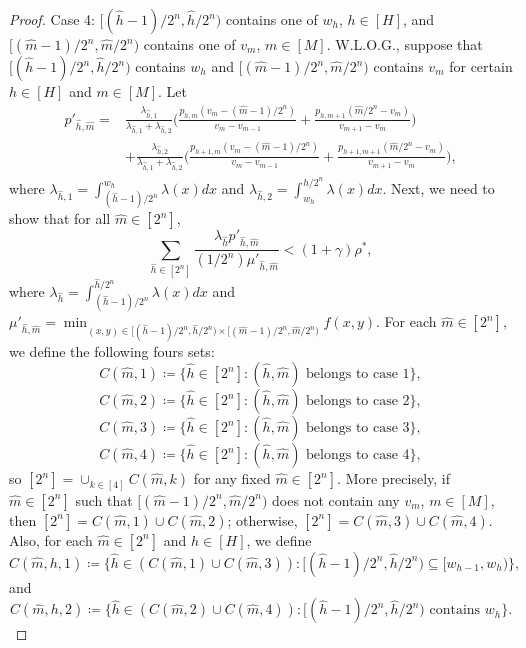 \documentclass[11pt, reqno]{article}
\numberwithin{equation}{section}
\numberwithin{theorem}{section}
\begin{document}
\begin{proof}
Case 4: $[(\hat{h}-1)/2^n,\hat{h}/2^n)$ contains one of $w_h$, $h\in[H]$, and $[(\hat{m}-1)/2^n,\hat{m}/2^n)$ contains one of $v_m$, $m\in[M]$. W.L.O.G., suppose that $[(\hat{h}-1)/2^n,\hat{h}/2^n)$ contains $w_h$ and $[(\hat{m}-1)/2^n,\hat{m}/2^n)$ contains $v_m$ for certain $h\in[H]$ and $m\in[M]$. Let 
\begin{equation*}
    \begin{split}
    p'_{\hat{h},\hat{m}}=&\frac{\lambda_{\hat{h},1}}{\lambda_{\hat{h},1}+\lambda_{\hat{h},2}}\Big(\frac{p_{h,m}(v_m-(\hat{m}-1)/2^n)}{v_m-v_{m-1}}+\frac{p_{h,m+1}(\hat{m}/2^n-v_m)}{v_{m+1}-v_m}\Big)\\
    &+\frac{\lambda_{\hat{h},2}}{\lambda_{\hat{h},1}+\lambda_{\hat{h},2}}\Big(\frac{p_{h+1,m}(v_m-(\hat{m}-1)/2^n)}{v_m-v_{m-1}}+\frac{p_{h+1,m+1}(\hat{m}/2^n-v_m)}{v_{m+1}-v_m}\Big),
\end{split}
\end{equation*}
where $\lambda_{\hat{h},1}=\int_{(\hat{h}-1)/2^n}^{w_h}\lambda(x)dx$ and $\lambda_{\hat{h},2}=\int^{\hat{h}/2^n}_{w_h}\lambda(x)dx$.
Next, we need to show that for all $\hat{m}\in[2^n]$,
\begin{equation}\label{eq: lambda'-p'_hm-mu'}
    \sum_{\hat{h}\in[2^n]}\frac{\lambda_{\hat{h}}p'_{\hat{h},\hat{m}}}{(1/2^n)\mu'_{\hat{h},\hat{m}}}<(1+\gamma)\rho^*,
\end{equation}
where $\lambda_{\hat{h}}=\int_{(\hat{h}-1)/2^n}^{\hat{h}/2^n}\lambda(x)dx$ and $\mu'_{\hat{h},\hat{m}}=\min_{(x,y)\in[(\hat{h}-1)/2^n,\hat{h}/2^n)\times [(\hat{m}-1)/2^n,\hat{m}/2^n)}f(x,y)$.
For each $\hat{m}\in[2^n]$, we define the following fours sets:
$$C(\hat{m},1)\coloneqq\{\hat{h}\in[2^n]:(\hat{h},\hat{m})\text{ belongs to case 1}\},$$
$$C(\hat{m},2)\coloneqq\{\hat{h}\in[2^n]:(\hat{h},\hat{m})\text{ belongs to case 2}\},$$
$$C(\hat{m},3)\coloneqq\{\hat{h}\in[2^n]:(\hat{h},\hat{m})\text{ belongs to case 3}\},$$
$$C(\hat{m},4)\coloneqq\{\hat{h}\in[2^n]:(\hat{h},\hat{m})\text{ belongs to case 4}\},$$
so $[2^n]=\cup_{k\in[4]}C(\hat{m},k)$ for any fixed $\hat{m}\in[2^n]$. More precisely, if $\hat{m}\in[2^n]$ such that $[(\hat{m}-1)/2^n,\hat{m}/2^n)$ does not contain any $v_m$, $m\in[M]$, then $[2^n]=C(\hat{m},1) \cup C(\hat{m},2)$; otherwise, $[2^n]=C(\hat{m},3) \cup C(\hat{m},4)$. 
Also, for each $\hat{m}\in[2^n]$ and $h\in[H]$, we define
$$C(\hat{m},h,1)\coloneqq\{\hat{h}\in (C(\hat{m},1)\cup C(\hat{m},3)): [(\hat{h}-1)/2^n,\hat{h}/2^n)\subseteq [w_{h-1},w_h)\},$$
and $$C(\hat{m},h,2)\coloneqq\{\hat{h}\in (C(\hat{m},2)\cup C(\hat{m},4)): [(\hat{h}-1)/2^n,\hat{h}/2^n)\text{ contains }w_h\}.$$

\end{proof}
\end{document}
